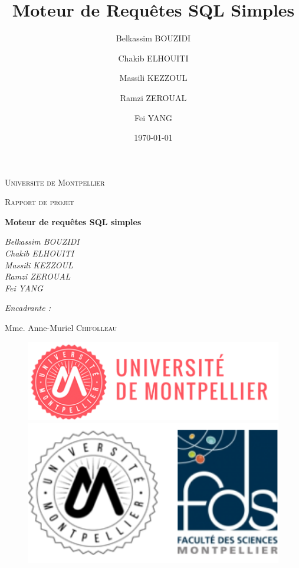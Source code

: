 \documentclass[oneside,13pt,a4paper]{report}
\title{Moteur de Requêtes SQL Simples}
\author{
    Belkassim BOUZIDI \and
    Chakib ELHOUITI \and
    Massili KEZZOUL \and
    Ramzi ZEROUAL \and
    Fei YANG
}
\date{\today}
\begin{document}
\begin{titlepage}
	\centering
	{\scshape\LARGE Universite de Montpellier\par}
	{\scshape\Large Rapport de projet\par}
	\vspace{1.5cm}
	{\huge\bfseries Moteur de requêtes SQL simples\par}
	\vspace{2cm}
	{\Large\itshape
		Belkassim BOUZIDI \\
		Chakib ELHOUITI \\
		Massili KEZZOUL \\
		Ramzi ZEROUAL \\
		Fei YANG \\
		\par}

	\vspace{1.5cm}

	{\Large\itshape
		Encadrante :\par
		Mme. Anne-Muriel \textsc{Chifolleau}
		\par}

	\vspace{2cm}

	\begin{figure}[h]
		\begin{minipage}[c]{.46\linewidth}
			\centering
			\includegraphics[width=1\textwidth]{img/univ-montpellier.png}
		\end{minipage}
		\hfill%
		\begin{minipage}[c]{.46\linewidth}
			\centering
			\includegraphics[width=1\textwidth]{img/fds.png}
		\end{minipage}
	\end{figure}


\end{titlepage}
\end{document}
